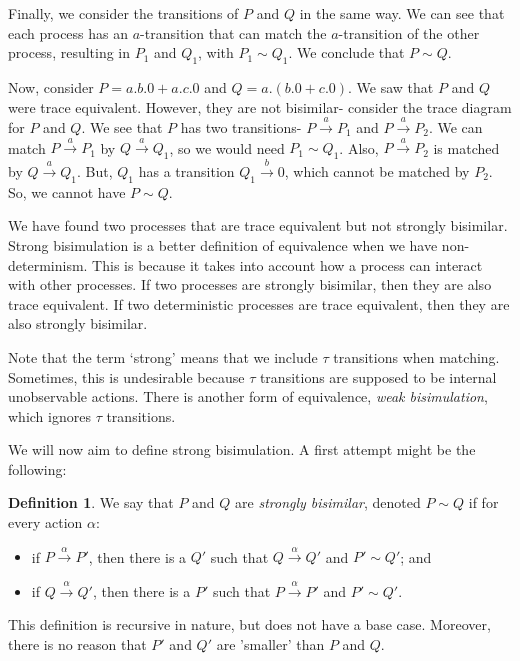 \documentclass[a4paper, openany]{memoir}
\theoremstyle{definition}
\newtheorem{definition}[proposition]{Definition}
\begin{document}
    Finally, we consider the transitions of $P$ and $Q$ in the same way. We can see that each process has an $a$-transition that can match the $a$-transition of the other process, resulting in $P_1$ and $Q_1$, with $P_1 \sim Q_1$. We conclude that $P \sim Q$.

    Now, consider $P = a.b.0 + a.c.0$ and $Q = a.(b.0 + c.0)$. We saw that $P$ and $Q$ were trace equivalent. However, they are not bisimilar- consider the trace diagram for $P$ and $Q$.
    We see that $P$ has two transitions- $P \xrightarrow{a} P_1$ and $P \xrightarrow{a} P_2$. We can match $P \xrightarrow{a} P_1$ by $Q \xrightarrow{a} Q_1$, so we would need $P_1 \sim Q_1$. Also, $P \xrightarrow{a} P_2$ is matched by $Q \xrightarrow{a} Q_1$. But, $Q_1$ has a transition $Q_1 \xrightarrow{b} 0$, which cannot be matched by $P_2$. So, we cannot have $P \sim Q$.

    We have found two processes that are trace equivalent but not strongly bisimilar. Strong bisimulation is a better definition of equivalence when we have non-determinism. This is because it takes into account how a process can interact with other processes. If two processes are strongly bisimilar, then they are also trace equivalent. If two deterministic processes are trace equivalent, then they are also strongly bisimilar.

    Note that the term `strong' means that we include $\tau$ transitions when matching. Sometimes, this is undesirable because $\tau$ transitions are supposed to be internal unobservable actions. There is another form of equivalence, \emph{weak bisimulation}, which ignores $\tau$ transitions.

    We will now aim to define strong bisimulation. A first attempt might be the following:
    \begin{definition}
        We say that $P$ and $Q$ are \emph{strongly bisimilar}, denoted $P \sim Q$ if for every action $\alpha$:
        \begin{itemize}
            \item if $P \xrightarrow{\alpha} P'$, then there is a $Q'$ such that $Q \xrightarrow{\alpha} Q'$ and $P' \sim Q'$; and
            \item if $Q \xrightarrow{\alpha} Q'$, then there is a $P'$ such that $P \xrightarrow{\alpha} P'$ and $P' \sim Q'$.
        \end{itemize}
    \end{definition}
    This definition is recursive in nature, but does not have a base case. Moreover, there is no reason that $P'$ and $Q'$ are 'smaller' than $P$ and $Q$.
\end{document}
